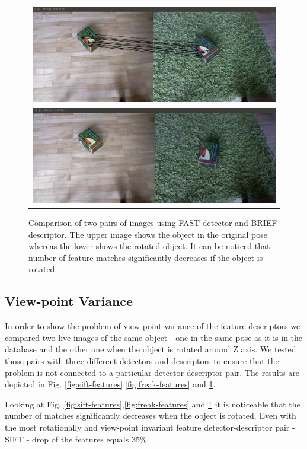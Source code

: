 \begin{figure}
    \begin{tabular}{c}
 

\includegraphics[width=0.7\columnwidth]{figures/brief-no-rotation.png}\\
\includegraphics[width=0.7\columnwidth]{figures/brief-rotation.png}\\
    \end{tabular}


\caption{Comparison of two pairs of images using FAST detector and BRIEF descriptor. The upper image shows the object in the original pose whereas the lower shows the rotated object. It can be noticed that number of feature matches significantly decreases if the object is rotated. }
\label{fig:brief-features}
\end{figure}


\subsection{View-point Variance}

In order to show the problem of view-point variance of the feature descriptors we compared two live images of the same object - one in the same pose as it is in the database and the other one when the object is rotated around Z axis. We tested those pairs with three different detectors and descriptors to ensure that the problem is not connected to a particular detector-descriptor pair. The results are depicted in Fig. \ref{fig:sift-features},\ref{fig:freak-features} and \ref{fig:brief-features}.

Looking at Fig. \ref{fig:sift-features},\ref{fig:freak-features} and \ref{fig:brief-features} it is noticeable that the number of matches significantly decreases when the object is rotated. Even with the most rotationally and view-point invariant feature detector-descriptor pair - SIFT - drop of the features equals 35$\%$.



